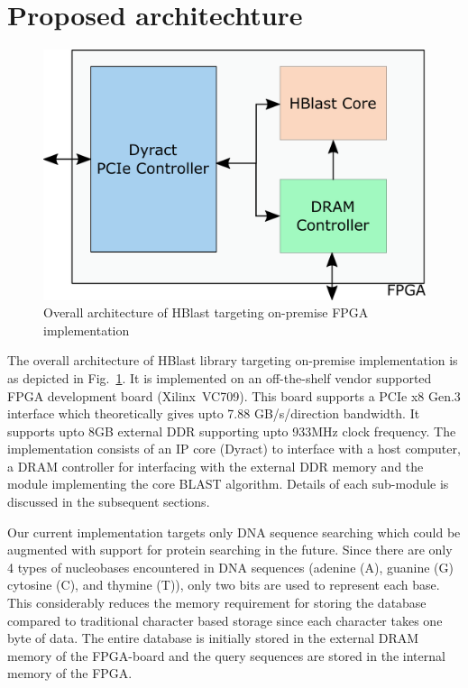 \section{Proposed architechture}
\label{sec:propesedArch}

\begin{figure}[t!]
\centering
\includegraphics[width=\columnwidth]{Figures/sysArch.pdf}
\caption{Overall architecture of HBlast targeting on-premise FPGA implementation} \label{fig:sysArch}
\end{figure}

The overall architecture of HBlast library targeting on-premise implementation is as depicted in Fig.~\ref{fig:sysArch}.
It is implemented on an off-the-shelf vendor supported FPGA development board (Xilinx~VC709).
This board supports a PCIe x8 Gen.3 interface which theoretically gives upto 7.88 GB/s/direction bandwidth.
It supports upto 8GB external DDR supporting upto 933MHz clock frequency.
The implementation consists of an IP core (Dyract) to interface with a host computer, a DRAM controller for interfacing with the external DDR memory and the module implementing the core BLAST algorithm.
Details of each sub-module is discussed in the subsequent sections.

Our current implementation targets only DNA sequence searching which could be augmented with support for protein searching in the future.
Since there are only 4 types of nucleobases encountered in DNA sequences (adenine (A), guanine (G) cytosine (C), and thymine (T)), only two bits are used to represent each base.
This considerably reduces the memory requirement for storing the database compared to traditional character based storage since each character takes one byte of data.
The entire database is initially stored in the external DRAM memory of the FPGA-board and the query sequences are stored in the internal memory of the FPGA.

